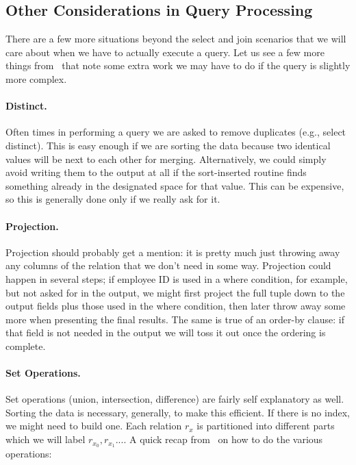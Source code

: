 \subsection*{Other Considerations in Query Processing}

There are a few more situations beyond the select and join scenarios that we will care about when we have to actually execute a query. Let us see a few more things from~\cite{dsc} that note some extra work we may have to do if the query is slightly more complex.

\paragraph{Distinct.} Often times in performing a query we are asked to remove duplicates (e.g., select distinct). This is easy enough if we are sorting the data because two identical values will be next to each other for merging. Alternatively, we could simply avoid writing them to the output at all if the sort-inserted routine finds something already in the designated space for that value. This can be expensive, so this is generally done only if we really ask for it.

\paragraph{Projection.} Projection should probably get a mention: it is pretty much just throwing away any columns of the relation that we don't need in some way. Projection could happen in several steps; if employee ID is used in a where condition, for example, but not asked for in the output, we might first project the full tuple down to the output fields plus those used in the where condition, then later throw away some more when presenting the final results. The same is true of an order-by clause: if that field is not needed in the output we will toss it out once the ordering is complete.

\paragraph{Set Operations.} Set operations (union, intersection, difference) are fairly self explanatory as well. Sorting the data is necessary, generally, to make this efficient. If there is no index, we might need to build one. Each relation $r_{x}$ is partitioned into different parts which we will label $r_{x_{0}}, r_{x_{1}}...$. A quick recap from~\cite{dsc} on how to do the various operations:

